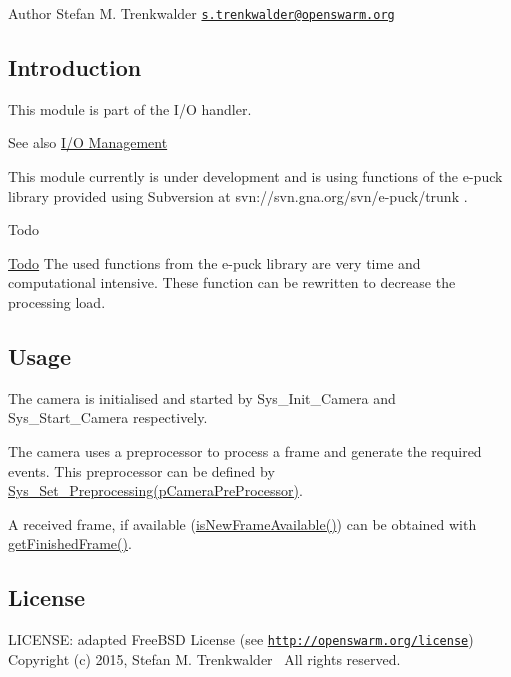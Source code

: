\begin{DoxyAuthor}{Author}
Stefan M. Trenkwalder \href{mailto:s.trenkwalder@openswarm.org}{\tt s.\+trenkwalder@openswarm.\+org}
\end{DoxyAuthor}
\hypertarget{group__camera_camera_intro}{}\subsection{Introduction}\label{group__camera_camera_intro}
This module is part of the I/\+O handler. \begin{DoxySeeAlso}{See also}
\hyperlink{group__io}{I/\+O Management}
\end{DoxySeeAlso}
This module currently is under development and is using functions of the e-\/puck library provided using Subversion at svn\+://svn.gna.\+org/svn/e-\/puck/trunk .

\begin{DoxyRefDesc}{Todo}
\item[\hyperlink{todo__todo000005}{Todo}]The used functions from the e-\/puck library are very time and computational intensive. These function can be rewritten to decrease the processing load.\end{DoxyRefDesc}
\hypertarget{group__camera_camera_usage}{}\subsection{Usage}\label{group__camera_camera_usage}
The camera is initialised and started by Sys\+\_\+\+Init\+\_\+\+Camera and Sys\+\_\+\+Start\+\_\+\+Camera respectively.

The camera uses a preprocessor to process a frame and generate the required events. This preprocessor can be defined by \hyperlink{camera_8h_ac93ec56d124a0811e638208ad64ed14c}{Sys\+\_\+\+Set\+\_\+\+Preprocessing(p\+Camera\+Pre\+Processor)}.

A received frame, if available (\hyperlink{camera_8h_a1b0543ca3f9389e59135838a3c9cbb23}{is\+New\+Frame\+Available()}) can be obtained with \hyperlink{camera_8h_a72c1d6c27d3aeb8399ec41247cc4ba58}{get\+Finished\+Frame()}.\hypertarget{group__camera_camera_license}{}\subsection{License}\label{group__camera_camera_license}
L\+I\+C\+E\+N\+S\+E\+: adapted Free\+B\+S\+D License (see \href{http://openswarm.org/license}{\tt http\+://openswarm.\+org/license})~\newline
Copyright (c) 2015, Stefan M. Trenkwalder~\newline
All rights reserved. 